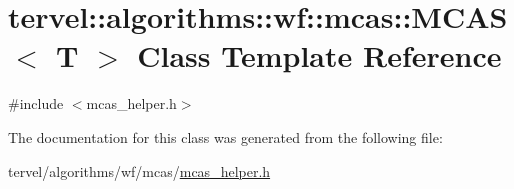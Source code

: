 \hypertarget{classtervel_1_1algorithms_1_1wf_1_1mcas_1_1_m_c_a_s}{}\section{tervel\+:\+:algorithms\+:\+:wf\+:\+:mcas\+:\+:M\+C\+A\+S$<$ T $>$ Class Template Reference}
\label{classtervel_1_1algorithms_1_1wf_1_1mcas_1_1_m_c_a_s}


{\ttfamily \#include $<$mcas\+\_\+helper.\+h$>$}



The documentation for this class was generated from the following file\+:\begin{DoxyCompactItemize}
\item 
tervel/algorithms/wf/mcas/\hyperlink{mcas__helper_8h}{mcas\+\_\+helper.\+h}\end{DoxyCompactItemize}
